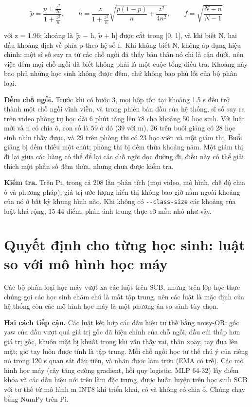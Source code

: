 \begin{equation}
\tilde p = \frac{p + \frac{z^2}{2n}}{1 + \frac{z^2}{n}}, \qquad h = \frac{z}{1 + \frac{z^2}{n}} \sqrt{\frac{p(1-p)}{n} + \frac{z^2}{4n^2}}, \qquad f = \sqrt{\frac{N - n}{N - 1}}
\end{equation}

với z = 1.96; khoảng là {[}\ensuremath{\tilde{p}} − h, \ensuremath{\tilde{p}} + h{]} được cắt trong {[}0, 1{]}, và khi biết N, hai đầu khoảng dịch về phía p theo hệ số f.~Khi không biết N, không áp dụng hiệu chỉnh: một sĩ số suy ra từ các chỗ ngồi đã thấy bản thân nó chỉ là cận dưới, nên việc đếm mọi chỗ ngồi đã biết không phải là một cuộc tổng điều tra. Khoảng này bao phủ những học sinh không được đếm, chứ không bao phủ lỗi của bộ phân loại.

\textbf{Đếm chỗ ngồi.} Trước khi có bước 3, mọi hộp tồn tại khoảng 1.5 s đều trở thành một chỗ ngồi vĩnh viễn, và trong phiên bản đầu của hệ thống, sĩ số suy ra trên video phòng tự học dài 6 phút tăng lên 78 cho khoảng 50 học sinh. Với luật mới và n có chia ô, con số là 59 ở đó (39 với m), 26 trên buổi giảng có 28 học sinh nhìn thấy được, và 29 trên phòng thi có 23 học viên và một giám thị. Buổi giảng bị đếm thiếu một chút; phòng thi bị đếm thừa khoảng năm. Một giám thị đi lại giữa các hàng có thể để lại các chỗ ngồi dọc đường đi, điều này có thể giải thích một phần số đếm thừa, nhưng chưa được kiểm tra.

\textbf{Kiểm tra.} Trên Pi, trong cả 208 lần phân tích (mọi video, mô hình, chế độ chia ô và phương pháp), giá trị ước lượng hiển thị không bao giờ nằm ngoài khoảng của nó ở bất kỳ khung hình nào. Khi không có \texttt{-\/-class-size} các khoảng của luật khá rộng, 15-44 điểm, phản ánh trung thực cỡ mẫu nhỏ như vậy.

\section{Quyết định cho từng học sinh: luật so với mô hình học máy}

Các bộ phân loại học máy vượt xa các luật trên SCB, nhưng trên lớp học thực chúng gọi các học sinh chăm chú là mất tập trung, nên các luật là mặc định của hệ thống còn các mô hình học máy là một phương án so sánh tùy chọn.

\textbf{Hai cách tiếp cận.} Các luật kết hợp các dấu hiệu tư thế bằng noisy-OR: góc yaw của đầu vượt quá giá trị gốc đã hiệu chỉnh của chỗ ngồi, đầu cúi thấp hơn giá trị gốc, khuôn mặt bị khuất trong khi vẫn thấy vai, thân xoay, tay đưa lên mặt; giơ tay luôn được tính là tập trung. Mỗi chỗ ngồi học tư thế chú ý của riêng nó trong 120 s quan sát đầu tiên, và nhãn được làm trơn (EMA có trễ). Các mô hình học máy (cây tăng cường gradient, hồi quy logistic, MLP 64-32) lấy điểm khóa và các dấu hiệu nói trên làm đặc trưng, được huấn luyện trên học sinh SCB với tư thế từ mô hình m INT8 khi triển khai, có và không có chia ô. Chúng chạy bằng NumPy trên Pi.

